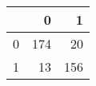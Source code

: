 \begin{tabular}{lrr}
\toprule
{} &    0 &    1 \\
\midrule
0 &  174 &   20 \\
1 &   13 &  156 \\
\bottomrule
\end{tabular}
